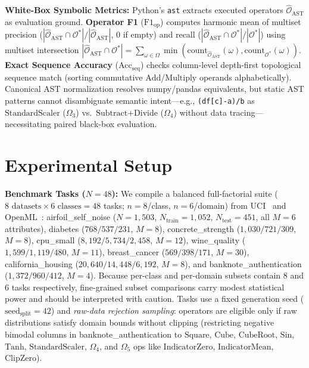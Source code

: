 \documentclass[sigconf]{acmart}
\begin{document}
\noindent\textbf{White-Box Symbolic Metrics:} Python's \texttt{ast} extracts executed operators $\widehat{\mathcal{O}}_{\text{AST}}$ as evaluation ground. \textbf{Operator F1} ($\text{F1}_{\text{op}}$) computes harmonic mean of multiset precision ($|\widehat{\mathcal{O}}_{\text{AST}}\cap\mathcal{O}^*|/|\widehat{\mathcal{O}}_{\text{AST}}|$, 0 if empty) and recall ($|\widehat{\mathcal{O}}_{\text{AST}}\cap\mathcal{O}^*|/|\mathcal{O}^*|$) using multiset intersection $|\widehat{\mathcal{O}}_{\text{AST}}\cap\mathcal{O}^*| = \sum_{\omega\in\Omega}\min(\text{count}_{\widehat{\mathcal{O}}_{\text{AST}}}(\omega), \text{count}_{\mathcal{O}^*}(\omega))$. \textbf{Exact Sequence Accuracy} ($\text{Acc}_{\text{seq}}$) checks column-level depth-first topological sequence match (sorting commutative $\text{Add}$/$\text{Multiply}$ operands alphabetically). Canonical AST normalization resolves numpy/pandas equivalents, but static AST patterns cannot disambiguate semantic intent—e.g., \texttt{(df[c]-a)/b} as $\text{StandardScaler}$ ($\Omega_3$) vs.\ $\text{Subtract}$+$\text{Divide}$ ($\Omega_4$) without data tracing—necessitating paired black-box evaluation.

\section{Experimental Setup}
\label{sec:exp_setup}
\noindent\textbf{Benchmark Tasks ($N=48$):} We compile a balanced full-factorial suite ($8 \text{ datasets} \times 6 \text{ classes} = 48$ tasks; $n=8$/class, $n=6$/domain) from UCI~\cite{dua2019uci} and OpenML~\cite{vanschoren2014openml}: \textsf{airfoil\_self\_noise} ($N=1,503$, $N_{\text{train}}=1,052$, $N_{\text{test}}=451$, all $M=6$ attributes), \textsf{diabetes} ($768/537/231$, $M=8$), \textsf{concrete\_strength} ($1,030/721/309$, $M=8$), \textsf{cpu\_small} ($8,192/5,734/2,458$, $M=12$), \textsf{wine\_quality} ($1,599/1,119/480$, $M=11$), \textsf{breast\_cancer} ($569/398/171$, $M=30$), \textsf{california\_housing} ($20,640/14,448/6,192$, $M=8$), and \textsf{banknote\_authentication} ($1,372/960/412$, $M=4$). Because per-class and per-domain subsets contain 8 and 6 tasks respectively, fine-grained subset comparisons carry modest statistical power and should be interpreted with caution. Tasks use a fixed generation seed ($\text{seed}_{\text{split}}=42$) and \emph{raw-data rejection sampling}: operators are eligible only if raw distributions satisfy domain bounds without clipping (restricting negative bimodal columns in \textsf{banknote\_authentication} to $\text{Square}$, $\text{Cube}$, $\text{CubeRoot}$, $\text{Sin}$, $\text{Tanh}$, $\text{StandardScaler}$, $\Omega_4$, and $\Omega_5$ ops like $\text{IndicatorZero}$, $\text{IndicatorMean}$, $\text{ClipZero}$).
\end{document}
